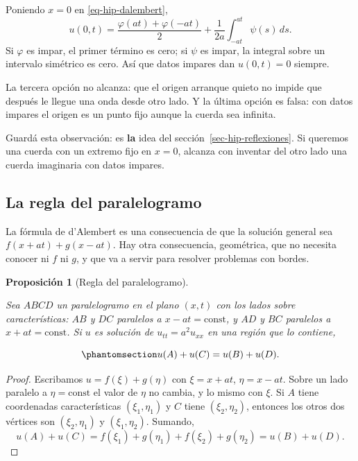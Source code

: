 \documentclass[
  spanish,
  a4paper,
]{scrbook}
\theoremstyle{definition}
\theoremstyle{plain}
\newtheorem{proposition}{Proposición}[chapter]
\theoremstyle{definition}
\theoremstyle{plain}
\theoremstyle{definition}
\theoremstyle{remark}
\begin{document}
Poniendo \(x = 0\) en \ref{eq-hip-dalembert},
\[u(0,t) = \frac{\varphi(at)+\varphi(-at)}{2} + \frac{1}{2a}\int_{-at}^{at}\psi(s)\,ds .\]
Si \(\varphi\) es impar, el primer término es cero; si \(\psi\) es
impar, la integral sobre un intervalo simétrico es cero. Así que datos
impares dan \(u(0,t) = 0\) siempre.

La tercera opción no alcanza: que el origen arranque quieto no impide
que después le llegue una onda desde otro lado. Y la última opción es
falsa: con datos impares el origen es un punto fijo aunque la cuerda sea
infinita.

Guardá esta observación: es \textbf{la} idea del
sección~\ref{sec-hip-reflexiones}. Si queremos una cuerda con un extremo
fijo en \(x=0\), alcanza con inventar del otro lado una cuerda
imaginaria con datos impares.

\subsection{La regla del paralelogramo}\label{sec-hip-paralelogramo}

La fórmula de d'Alembert es una consecuencia de que la solución general
sea \(f(x+at)+g(x-at)\). Hay otra consecuencia, geométrica, que no
necesita conocer ni \(f\) ni \(g\), y que va a servir para resolver
problemas con bordes.

\begin{proposition}[Regla del
paralelogramo]\protect\hypertarget{prp-hip-paralelogramo}{}\label{prp-hip-paralelogramo}

Sea \(ABCD\) un paralelogramo en el plano \((x,t)\) con los lados sobre
características: \(AB\) y \(DC\) paralelos a \(x-at=\text{const}\), y
\(AD\) y \(BC\) paralelos a \(x+at=\text{const}\). Si \(u\) es solución
de \(u_{tt}=a^2u_{xx}\) en una región que lo contiene,

\begin{equation}\protect\phantomsection\label{eq-hip-paralelogramo}{
u(A) + u(C) = u(B) + u(D) .
}\end{equation}

\end{proposition}

\begin{proof}
Escribamos \(u = f(\xi) + g(\eta)\) con \(\xi = x+at\), \(\eta=x-at\).
Sobre un lado paralelo a \(\eta=\text{const}\) el valor de \(\eta\) no
cambia, y lo mismo con \(\xi\). Si \(A\) tiene coordenadas
características \((\xi_1,\eta_1)\) y \(C\) tiene \((\xi_2,\eta_2)\),
entonces los otros dos vértices son \((\xi_2,\eta_1)\) y
\((\xi_1,\eta_2)\). Sumando, \[
u(A) + u(C) = f(\xi_1)+g(\eta_1)+f(\xi_2)+g(\eta_2) = u(B) + u(D) .
\]
\end{proof}
\end{document}
